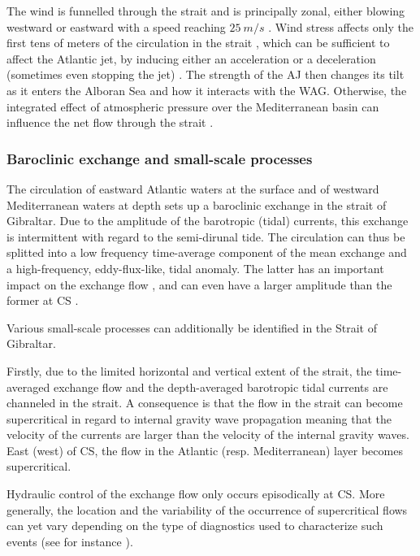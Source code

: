 The wind is funnelled through the strait and is principally zonal, either blowing westward or eastward with a speed reaching $25\ m/s$ \citep{candela_1989}. Wind stress affects only the first tens of meters of the circulation in the strait \citep{candela_1989}, which can be sufficient to affect the Atlantic jet, by inducing either an acceleration or a deceleration (sometimes even stopping the jet) \citep{lorente_2019}. The strength of the AJ then changes its tilt as it enters the Alboran Sea and how it interacts with the WAG. Otherwise, the integrated effect of atmospheric pressure over the Mediterranean basin can influence the net flow through the strait \citep{garcialafuente_2002}.



\subsubsection{Baroclinic exchange and small-scale processes}


The circulation of eastward Atlantic waters at the surface and of westward Mediterranean waters at depth sets up a baroclinic exchange in the strait of Gibraltar. Due to the amplitude of the barotropic (tidal) currents, this exchange is intermittent with regard to the semi-dirunal tide. The circulation can thus be splitted into a low frequency time-average component of the mean exchange and a high-frequency, eddy-flux-like, tidal anomaly. The latter has an important impact on the exchange flow \citep{Naranjo2014}, and can even have a larger amplitude than the former at CS \citep{vargas_2006}.

Various small-scale processes can additionally be identified in the Strait of Gibraltar.

Firstly, due to the limited horizontal and vertical extent of the strait, the time-averaged exchange flow and the depth-averaged barotropic tidal currents are channeled in the strait. A consequence is that the flow in the strait can become supercritical in regard to internal gravity wave propagation meaning that the velocity of the currents are larger than the velocity of the internal gravity waves.  East (west) of CS, the flow in the Atlantic (resp. Mediterranean) layer becomes supercritical.



Hydraulic control of the exchange flow only occurs episodically at CS. More generally, the location and the variability of the occurrence of supercritical flows can yet vary depending on the type of diagnostics used to characterize such events (see for instance \citet{FA1988,vargas_2006,sannino_2007,sanchez-roman_2012}). 

